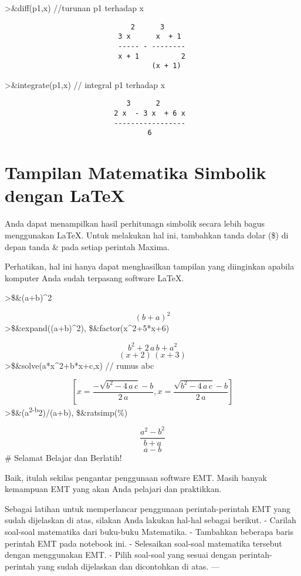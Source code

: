 \documentclass[
]{book}
\begin{document}
\textgreater\&diff(p1,x) //turunan p1 terhadap x

\begin{verbatim}
                              2      3
                           3 x      x  + 1
                           ----- - --------
                           x + 1          2
                                   (x + 1)
\end{verbatim}

\textgreater\&integrate(p1,x) // integral p1 terhadap x

\begin{verbatim}
                             3      2
                          2 x  - 3 x  + 6 x
                          -----------------
                                  6
\end{verbatim}

\chapter{Tampilan Matematika Simbolik dengan LaTeX}\label{tampilan-matematika-simbolik-dengan-latex}

Anda dapat menampilkan hasil perhitunagn simbolik secara lebih bagus menggunakan LaTeX. Untuk melakukan hal ini, tambahkan tanda dolar (\$) di depan tanda \& pada setiap perintah Maxima.

Perhatikan, hal ini hanya dapat menghasilkan tampilan yang diinginkan apabila komputer Anda sudah terpasang software LaTeX.

\textgreater\$\&(a+b)\^{}2

\[\left(b+a\right)^2\]\textgreater\$\&expand((a+b)\^{}2), \$\&factor(x\^{}2+5*x+6)

\[b^2+2\,a\,b+a^2\]\[\left(x+2\right)\,\left(x+3\right)\]\textgreater\$\&solve(a*x\^{}2+b*x+c,x) // rumus abc

\[\left[ x=\frac{-\sqrt{b^2-4\,a\,c}-b}{2\,a} , x=\frac{\sqrt{b^2-4\,
 a\,c}-b}{2\,a} \right] \]\textgreater\$\&(a\textsuperscript{2-b}2)/(a+b), \$\&ratsimp(\%)

\[\frac{a^2-b^2}{b+a}\]\[a-b\]\# Selamat Belajar dan Berlatih!

Baik, itulah sekilas pengantar penggunaan software EMT. Masih banyak kemampuan EMT yang akan Anda pelajari dan praktikkan.

Sebagai latihan untuk memperlancar penggunaan perintah-perintah EMT yang sudah dijelaskan di atas, silakan Anda lakukan hal-hal sebagai berikut. - Carilah soal-soal matematika dari buku-buku Matematika. - Tambahkan beberapa baris perintah EMT pada notebook ini. - Selesaikan soal-soal matematika tersebut dengan menggunakan EMT. - Pilih soal-soal yang sesuai dengan perintah-perintah yang sudah dijelaskan dan dicontohkan di atas. ---
\end{document}
